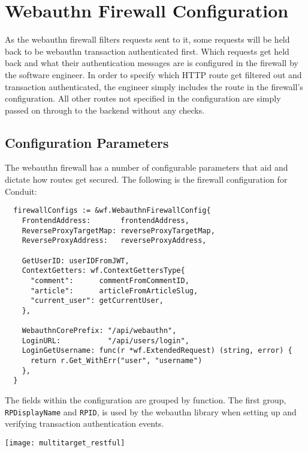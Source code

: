 \section{Webauthn Firewall Configuration}


As the webauthn firewall filters requests sent to it, some requests will be held back to be webauthn transaction authenticated first. Which requests get held back and what their authentication messages are is configured in the firewall by the software engineer. In order to specify which HTTP route get filtered out and transaction authenticated, the engineer simply includes the route in the firewall's configuration. All other routes not specified in the configuration are simply passed on through to the backend without any checks.

\subsection{Configuration Parameters}\label{Sec:ConfigurationParameters}

The webauthn firewall has a number of configurable parameters that aid and dictate how routes get secured. The following is the firewall configuration for Conduit:

\begin{lstlisting}
  firewallConfigs := &wf.WebauthnFirewallConfig{
    FrontendAddress:       frontendAddress,
    ReverseProxyTargetMap: reverseProxyTargetMap,
    ReverseProxyAddress:   reverseProxyAddress,

    GetUserID: userIDFromJWT,
    ContextGetters: wf.ContextGettersType{
      "comment":      commentFromCommentID,
      "article":      articleFromArticleSlug,
      "current_user": getCurrentUser,
    },

    WebauthnCorePrefix: "/api/webauthn",
    LoginURL:           "/api/users/login",
    LoginGetUsername: func(r *wf.ExtendedRequest) (string, error) {
      return r.Get_WithErr("user", "username")
    },
  }
\end{lstlisting}

The fields within the configuration are grouped by function. The first group, \lstinline{RPDisplayName} and \lstinline{RPID}, is used by the webauthn library when setting up and verifying transaction authentication events. 

\begin{center}
\texttt{[image: multitarget\_restful]}
\end{center}

